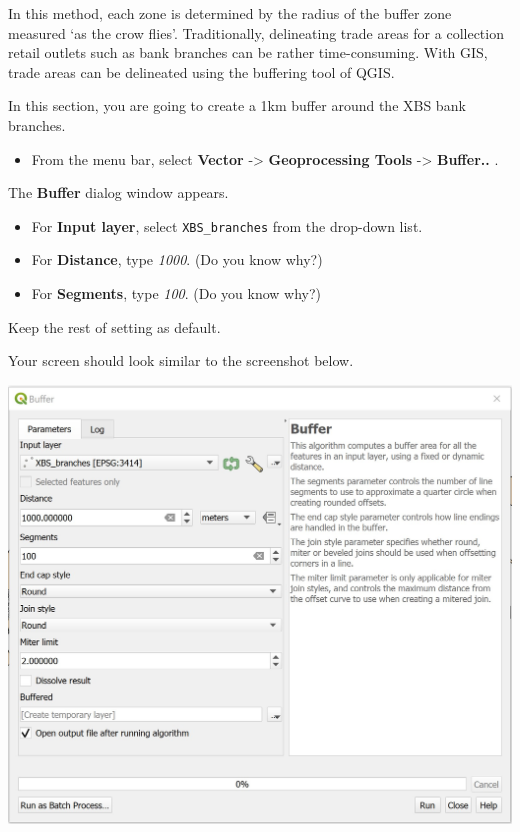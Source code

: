 \documentclass[
  letterpaper,
  DIV=11,
  numbers=noendperiod]{scrreprt}
\providecommand{\tightlist}{%
  \setlength{\itemsep}{0pt}\setlength{\parskip}{0pt}}\usepackage{longtable,booktabs,array}
\begin{document}
In this method, each zone is determined by the radius of the buffer zone
measured `as the crow flies'. Traditionally, delineating trade areas for
a collection retail outlets such as bank branches can be rather
time-consuming. With GIS, trade areas can be delineated using the
buffering tool of QGIS.

In this section, you are going to create a 1km buffer around the XBS
bank branches.

\begin{itemize}
\tightlist
\item
  From the menu bar, select \textbf{Vector} -\textgreater{}
  \textbf{Geoprocessing Tools} -\textgreater{} \textbf{Buffer..} .
\end{itemize}

The \textbf{Buffer} dialog window appears.

\begin{itemize}
\tightlist
\item
  For \textbf{Input layer}, select \texttt{XBS\_branches} from the
  drop-down list.
\item
  For \textbf{Distance}, type \emph{1000}. (Do you know why?)
\item
  For \textbf{Segments}, type \emph{100}. (Do you know why?)
\end{itemize}

Keep the rest of setting as default.

Your screen should look similar to the screenshot below.

\includegraphics{./img05/image15.jpg}
\end{document}

